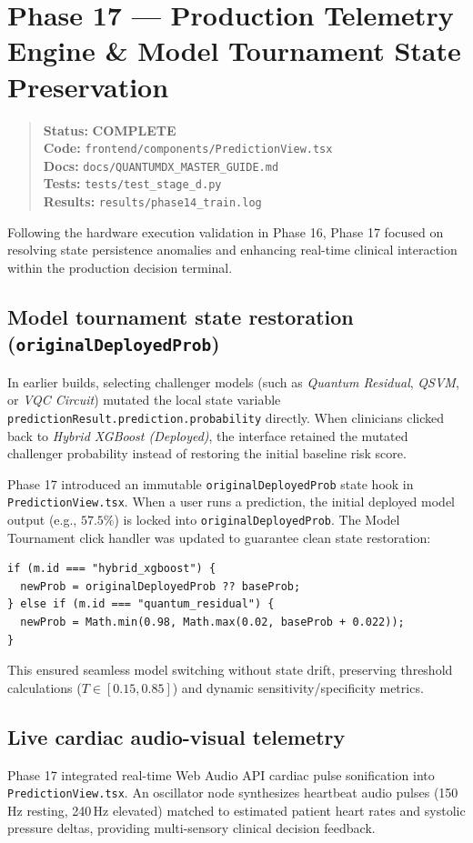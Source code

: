 \documentclass[11pt,a4paper]{article}
\newcommand{\code}[1]{\texttt{\small #1}}
\newcommand{\done}{\textcolor{donecolor}{\textbf{COMPLETE}}}
\newcommand{\phasestatus}[5]{%
\begin{quote}\small\raggedright
\textbf{Status:} #1 \\
\textbf{Code:} #2 \\
\textbf{Docs:} #3 \\
\textbf{Tests:} #4 \\
\textbf{Results:} #5
\end{quote}}
\begin{document}
\section{Phase 17 --- Production Telemetry Engine \& Model Tournament State Preservation}
\label{sec:phase17}

\phasestatus{\done}{\code{frontend/components/PredictionView.tsx}}{\code{docs/QUANTUMDX\_MASTER\_GUIDE.md}}{\code{tests/test\_stage\_d.py}}{\code{results/phase14\_train.log}}

Following the hardware execution validation in Phase 16, Phase 17 focused on resolving state persistence anomalies and enhancing real-time clinical interaction within the production decision terminal.

\subsection{Model tournament state restoration (\code{originalDeployedProb})}
In earlier builds, selecting challenger models (such as \emph{Quantum Residual}, \emph{QSVM}, or \emph{VQC Circuit}) mutated the local state variable \code{predictionResult.prediction.probability} directly. When clinicians clicked back to \emph{Hybrid XGBoost (Deployed)}, the interface retained the mutated challenger probability instead of restoring the initial baseline risk score. 

Phase 17 introduced an immutable \code{originalDeployedProb} state hook in \code{PredictionView.tsx}. When a user runs a prediction, the initial deployed model output (e.g., $57.5\%$) is locked into \code{originalDeployedProb}. The Model Tournament click handler was updated to guarantee clean state restoration:
\begin{lstlisting}
if (m.id === "hybrid_xgboost") {
  newProb = originalDeployedProb ?? baseProb;
} else if (m.id === "quantum_residual") {
  newProb = Math.min(0.98, Math.max(0.02, baseProb + 0.022));
}
\end{lstlisting}
This ensured seamless model switching without state drift, preserving threshold calculations ($T \in [0.15, 0.85]$) and dynamic sensitivity/specificity metrics.

\subsection{Live cardiac audio-visual telemetry}
Phase 17 integrated real-time Web Audio API cardiac pulse sonification into \code{PredictionView.tsx}. An oscillator node synthesizes heartbeat audio pulses (150\,Hz resting, 240\,Hz elevated) matched to estimated patient heart rates and systolic pressure deltas, providing multi-sensory clinical decision feedback.
\end{document}
